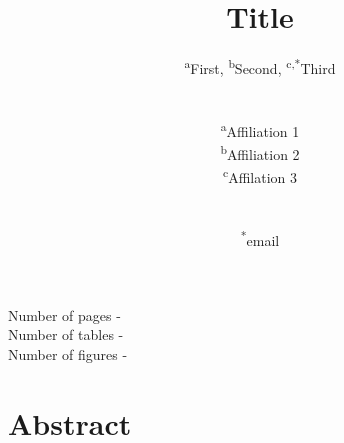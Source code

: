 \documentclass[11pt,a4paper]{article}
\makeatletter
\renewcommand\tableofcontents{%
    \@starttoc{toc}%
}
\makeatother
\begin{document}
\begin{titlepage}
    \title{Title}
    \author{
        \textsuperscript{a}First, 
        \textsuperscript{b}Second,
        \textsuperscript{c,*}Third
        \\ \\ \\
        \textsuperscript{a}Affiliation 1\\
        \textsuperscript{b}Affiliation 2\\
        \textsuperscript{c}Affilation 3
        \\ \\ \\
        \textsuperscript{*}email
    }
\clearpage %
\maketitle
\vspace*{\fill}
\begin{flushright}{
        \noindent Number of pages - \pageref{LastPage} \\
        \noindent Number of tables - \totaltables \\
        \noindent Number of figures - \totalfigures 
}
\end{flushright}
\thispagestyle{empty} %
\end{titlepage}




\listoftodos[Notes] %


\newpage


\onehalfspacing %


\linenumbers %
\pagewiselinenumbers %
\modulolinenumbers[5] %




\section*{Abstract}


\newpage


\printnoidxglossary


\newpage
\end{document}
